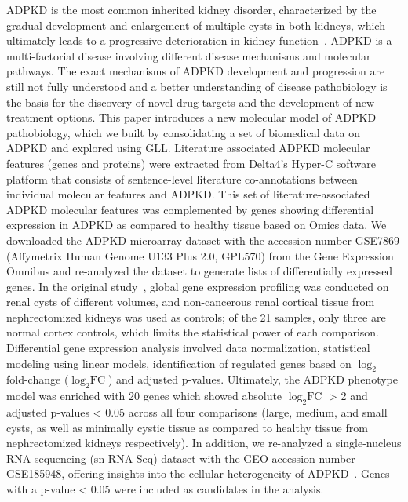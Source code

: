 ADPKD is the most common inherited kidney disorder, characterized by the gradual development and enlargement of multiple cysts in both kidneys, which ultimately leads to a progressive deterioration in kidney function~\citep{formicaMolecularPathwaysInvolved2020}. ADPKD is a multi-factorial disease involving different disease mechanisms and molecular pathways. The exact mechanisms of ADPKD development and progression are still not fully understood and a better understanding of disease pathobiology is the basis for the discovery of novel drug targets and the development of new treatment options.
This paper introduces a new molecular model of ADPKD pathobiology, which we built by consolidating a set of biomedical data on ADPKD and explored using GLL.
Literature associated ADPKD molecular features (genes and proteins) were extracted from Delta4's Hyper-C software platform that consists of sentence-level literature co-annotations between individual molecular features and ADPKD. This set of literature-associated ADPKD molecular features was complemented by genes showing differential expression in ADPKD as compared to healthy tissue based on Omics data.
We downloaded the ADPKD microarray dataset with the accession number GSE7869 (Affymetrix Human Genome U133 Plus 2.0, GPL570) from the Gene Expression Omnibus and re-analyzed the dataset to generate lists of differentially expressed genes. In the original study~\citep{songSystemsBiologyAutosomal2009}, global gene expression profiling was conducted on renal cysts of different volumes, and non-cancerous renal cortical tissue from nephrectomized kidneys was used as controls; of the 21 samples, only three are normal cortex controls, which limits the statistical power of each comparison. Differential gene expression analysis involved data normalization, statistical modeling using linear models, identification of regulated genes based on $\log_2$ fold-change ($\log_2 \text{FC}$) and adjusted p-values. Ultimately, the ADPKD phenotype model was enriched with 20 genes which showed absolute $\log_2 \text{FC}$ > 2 and adjusted p-values < 0.05 across all four comparisons (large, medium, and small cysts, as well as minimally cystic tissue as compared to healthy tissue from nephrectomized kidneys respectively). In addition, we re-analyzed a single-nucleus RNA sequencing (sn-RNA-Seq) dataset with the GEO accession number GSE185948, offering insights into the cellular heterogeneity of ADPKD~\citep{mutoDefiningCellularComplexity2022}. Genes with a p-value < 0.05 were included as candidates in the analysis.

